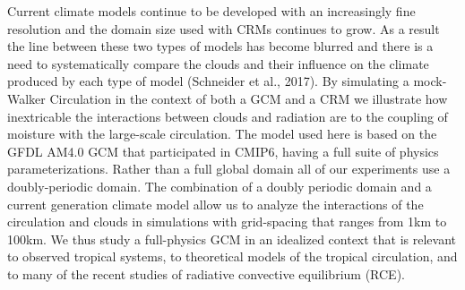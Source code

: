 \documentclass[draft]{agujournal2019}
\begin{document}
Current climate models continue to be developed with an increasingly fine resolution and 
the domain size used with CRMs continues to grow.  As a result the line between these two types 
of models has become blurred and there is a need to systematically compare the clouds and their 
influence on the climate produced by each type of model (Schneider et al., 2017).
By simulating a mock-Walker Circulation in the context of both a GCM and a CRM we 
illustrate how inextricable the interactions between clouds and radiation are to the coupling 
of moisture with the large-scale circulation.     
The model used here is based on the GFDL AM4.0 GCM that participated in CMIP6, 
having a full suite of physics parameterizations.  
Rather than a full global domain all of our experiments use a doubly-periodic domain.  
The combination of a doubly periodic domain and a current generation climate model allow us to analyze the interactions of the 
circulation and clouds in simulations with grid-spacing that ranges from 1km to 100km.  
We thus study a full-physics GCM in an idealized context that is relevant to observed tropical systems, to theoretical
models of the tropical circulation, and to many of the recent studies of radiative convective equilibrium (RCE).   

\end{document}
